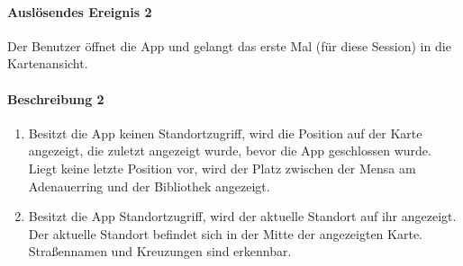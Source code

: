 \paragraph{Auslösendes Ereignis 2}
Der Benutzer öffnet die App und gelangt das erste Mal (für diese Session) in die Kartenansicht.
\paragraph{Beschreibung 2}
\begin{enumerate}
    \item Besitzt die App keinen Standortzugriff, wird die Position auf der Karte angezeigt, die zuletzt angezeigt wurde, bevor die App geschlossen wurde. Liegt keine letzte Position vor, wird der Platz zwischen der Mensa am Adenauerring und der Bibliothek angezeigt.
    \item Besitzt die App Standortzugriff, wird der aktuelle Standort auf ihr angezeigt. Der aktuelle Standort befindet sich in der Mitte der angezeigten Karte. Straßennamen und Kreuzungen sind erkennbar.
\end{enumerate}